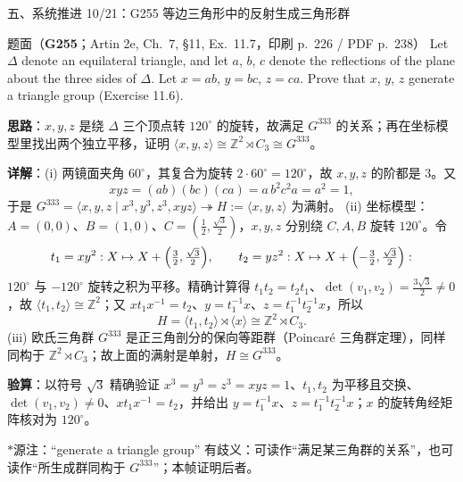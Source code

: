 \documentclass[aspectratio=169,10pt,fontset=none]{ctexbeamer}
\newcommand{\ex}[1]{\textcolor{accent}{\footnotesize\bfseries #1}}
\newcommand{\key}[1]{\textcolor{ink}{\bfseries #1}}
\newcommand{\starpt}{\textcolor{accent}{\bfseries$\ast$}}
\begin{document}
\begin{frame}[t]{五、系统推进 10/21：G255 等边三角形中的反射生成三角形群}
\label{ex:G255}
\scriptsize
\begin{block}{\footnotesize 题面（\ex{G255}；Artin 2e, Ch.~7, §11, Ex.~11.7，印刷 p.~226 / PDF p.~238）}
Let $\Delta$ denote an equilateral triangle, and let $a$, $b$, $c$ denote the reflections of the plane about the three sides of $\Delta$. Let $x=ab$, $y=bc$, $z=ca$. Prove that $x$, $y$, $z$ generate a triangle group (Exercise 11.6).
\end{block}
\key{思路}：$x,y,z$ 是绕 $\Delta$ 三个顶点转 $120^\circ$ 的旋转，故满足 $G^{333}$ 的关系；再在坐标模型里找出两个独立平移，证明 $\langle x,y,z\rangle\cong\mathbb Z^2\rtimes C_3\cong G^{333}$。

\key{详解}：(i) 两镜面夹角 $60^\circ$，其复合为旋转 $2\cdot60^\circ=120^\circ$，故 $x,y,z$ 的阶都是 $3$。又
\[
xyz=(ab)(bc)(ca)=a\,b^2c^2a=a^2=1 ,
\]
于是 $G^{333}=\langle x,y,z\mid x^3,y^3,z^3,xyz\rangle\twoheadrightarrow H:=\langle x,y,z\rangle$ 为满射。
(ii) 坐标模型：$A=(0,0)$、$B=(1,0)$、$C=(\tfrac12,\tfrac{\sqrt3}2)$，$x,y,z$ 分别绕 $C,A,B$ 旋转 $120^\circ$。令
\[
t_1=xy^2:X\mapsto X+\Bigl(\tfrac32,\tfrac{\sqrt3}2\Bigr),\qquad
t_2=yz^2:X\mapsto X+\Bigl(-\tfrac32,\tfrac{\sqrt3}2\Bigr):
\]
$120^\circ$ 与 $-120^\circ$ 旋转之积为平移。精确计算得 $t_1t_2=t_2t_1$、$\det(v_1,v_2)=\tfrac{3\sqrt3}2\neq0$，故 $\langle t_1,t_2\rangle\cong\mathbb Z^2$；又 $xt_1x^{-1}=t_2$、$y=t_1^{-1}x$、$z=t_1^{-1}t_2^{-1}x$，所以
\[
H=\langle t_1,t_2\rangle\rtimes\langle x\rangle\cong\mathbb Z^2\rtimes C_3 .
\]
(iii) 欧氏三角群 $G^{333}$ 是正三角剖分的保向等距群（Poincaré 三角群定理），同样同构于 $\mathbb Z^2\rtimes C_3$；故上面的满射是单射，$H\cong G^{333}$。

\key{验算}：以符号 $\sqrt3$ 精确验证 $x^3=y^3=z^3=xyz=1$、$t_1,t_2$ 为平移且交换、$\det(v_1,v_2)\neq0$、$xt_1x^{-1}=t_2$，并给出 $y=t_1^{-1}x$、$z=t_1^{-1}t_2^{-1}x$；$x$ 的旋转角经矩阵核对为 $120^\circ$。

\starpt 源注：“generate a triangle group” 有歧义：可读作“满足某三角群的关系”，也可读作“所生成群同构于 $G^{333}$”；本帧证明后者。
\end{frame}
\end{document}
